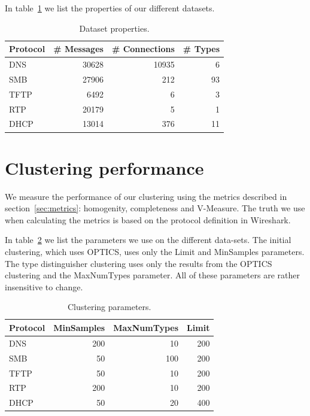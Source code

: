 \documentclass[a4paper]{report}
\begin{document}
In table~\ref{tab:datasets} we list the properties of our different datasets.


\begin{table}[h]
    \centering
    \captionsetup{width=0.8\textwidth}
    \caption{Dataset properties.}
    \begin{tabular}{| l | r | r | r |}
        \hline
        \textbf{Protocol}&\textbf{\# Messages}&\textbf{\# Connections}&\textbf{\# Types}\\ \hline
        DNS         & 30628         & 10935         & 6         \\ \hline
        SMB         & 27906         & 212           & 93        \\ \hline
        TFTP        & 6492          & 6             & 3         \\ \hline
        RTP         & 20179         & 5             & 1         \\ \hline
        DHCP        & 13014         & 376           & 11        \\ \hline
    \end{tabular}
    \label{tab:datasets}
\end{table}

\section{Clustering performance}
\label{sec:clustperf}
We measure the performance of our clustering using the metrics described in
section~\ref{sec:metrics}: homogenity, completeness and V-Measure. The truth we
use when calculating the metrics is based on the protocol definition in
Wireshark.

In table~\ref{tab:clusterparams} we list the parameters we use on the
different data-sets. The initial clustering, which uses OPTICS, uses only the
Limit and MinSamples parameters. The type distinguisher clustering uses only
the results from the OPTICS clustering and the MaxNumTypes parameter. All of
these parameters are rather insensitive to change.

\begin{table}[h]
    \centering
    \captionsetup{width=0.8\textwidth}
    \caption{Clustering parameters.}
    \begin{tabular}{| l | r | r | r |}
        \hline
        \textbf{Protocol}&\textbf{MinSamples}&\textbf{MaxNumTypes}&\textbf{Limit} \\ \hline
        DNS & 200 & 10 & 200 \\ \hline
        SMB & 50 & 100 & 200 \\ \hline
        TFTP & 50 & 10 & 200 \\ \hline
        RTP & 200 & 10 & 200 \\ \hline
        DHCP & 50 & 20 & 400 \\ \hline
    \end{tabular}
    \label{tab:clusterparams}
\end{table}
\end{document}

